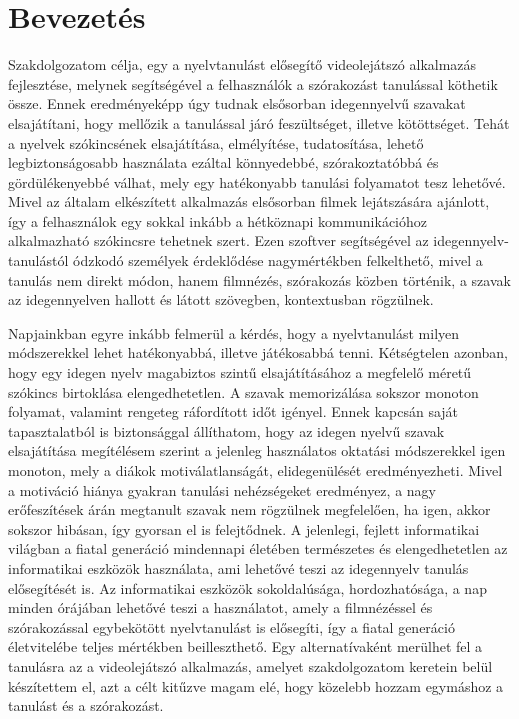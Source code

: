 \chapter*{Bevezetés}
Szakdolgozatom célja, egy a nyelvtanulást elősegítő videolejátszó alkalmazás fejlesztése, melynek segítségével a felhasználók a szórakozást tanulással köthetik össze. Ennek eredményeképp úgy tudnak elsősorban idegennyelvű szavakat elsajátítani, hogy mellőzik a tanulással járó feszültséget, illetve kötöttséget. Tehát a nyelvek szókincsének elsajátítása, elmélyítése, tudatosítása, lehető legbiztonságosabb használata ezáltal könnyedebbé, szórakoztatóbbá és gördülékenyebbé válhat, mely egy hatékonyabb tanulási folyamatot tesz lehetővé. Mivel az általam elkészített alkalmazás elsősorban filmek lejátszására ajánlott, így a felhasználok egy sokkal inkább a hétköznapi kommunikációhoz alkalmazható szókincsre tehetnek szert. Ezen szoftver segítségével az idegennyelv-tanulástól ódzkodó személyek érdeklődése nagymértékben felkelthető, mivel a tanulás nem direkt módon, hanem filmnézés, szórakozás közben történik, a szavak az idegennyelven hallott és látott szövegben, kontextusban rögzülnek. 

Napjainkban egyre inkább felmerül a kérdés, hogy a nyelvtanulást milyen módszerekkel lehet hatékonyabbá, illetve játékosabbá tenni. Kétségtelen azonban, hogy egy idegen nyelv magabiztos szintű elsajátításához a megfelelő méretű szókincs birtoklása elengedhetetlen. A szavak memorizálása sokszor monoton folyamat, valamint rengeteg ráfordított időt igényel. Ennek kapcsán saját tapasztalatból is biztonsággal állíthatom, hogy az idegen nyelvű szavak elsajátítása megítélésem szerint a jelenleg használatos oktatási módszerekkel igen monoton, mely a diákok motiválatlanságát, elidegenülését eredményezheti. Mivel a motiváció hiánya gyakran tanulási nehézségeket eredményez, a nagy erőfeszítések árán megtanult szavak nem rögzülnek megfelelően, ha igen, akkor sokszor hibásan, így gyorsan el is felejtődnek. A jelenlegi, fejlett informatikai világban a fiatal generáció mindennapi életében természetes és elengedhetetlen az informatikai eszközök használata, ami lehetővé teszi az idegennyelv tanulás elősegítését is. Az informatikai eszközök sokoldalúsága, hordozhatósága, a nap minden órájában lehetővé teszi a használatot, amely a filmnézéssel és szórakozással egybekötött nyelvtanulást is elősegíti, így a fiatal generáció életvitelébe teljes mértékben beilleszthető.
 Egy alternatívaként merülhet fel a tanulásra az a videolejátszó alkalmazás, amelyet szakdolgozatom keretein belül készítettem el, azt a célt kitűzve magam elé, hogy közelebb hozzam egymáshoz a tanulást és a szórakozást. 

